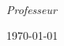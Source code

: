 \begin{titlepage}
	\HRule\\[1.5cm]
	
	
		\begin{center}
			\large
			\textit{Professeur}\\
		\end{center}
	
	
	\vfill\vfill\vfill %
	
	{\large\today} %
	
	
	\vfill %
	
\end{titlepage}
